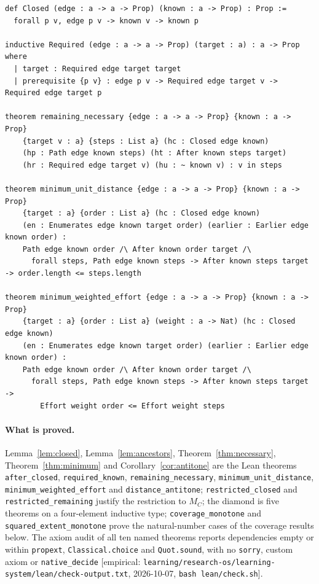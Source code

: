 \documentclass[11pt]{article}
\newcommand{\emp}[1]{\textcolor{bucketgray}{\footnotesize [empirical: #1]}}
\begin{document}
\begin{lstlisting}[style=bucketlean]
def Closed (edge : a -> a -> Prop) (known : a -> Prop) : Prop :=
  forall p v, edge p v -> known v -> known p

inductive Required (edge : a -> a -> Prop) (target : a) : a -> Prop where
  | target : Required edge target target
  | prerequisite {p v} : edge p v -> Required edge target v -> Required edge target p

theorem remaining_necessary {edge : a -> a -> Prop} {known : a -> Prop}
    {target v : a} {steps : List a} (hc : Closed edge known)
    (hp : Path edge known steps) (ht : After known steps target)
    (hr : Required edge target v) (hu : ~ known v) : v in steps

theorem minimum_unit_distance {edge : a -> a -> Prop} {known : a -> Prop}
    {target : a} {order : List a} (hc : Closed edge known)
    (en : Enumerates edge known target order) (earlier : Earlier edge known order) :
    Path edge known order /\ After known order target /\
      forall steps, Path edge known steps -> After known steps target -> order.length <= steps.length

theorem minimum_weighted_effort {edge : a -> a -> Prop} {known : a -> Prop}
    {target : a} {order : List a} (weight : a -> Nat) (hc : Closed edge known)
    (en : Enumerates edge known target order) (earlier : Earlier edge known order) :
    Path edge known order /\ After known order target /\
      forall steps, Path edge known steps -> After known steps target ->
        Effort weight order <= Effort weight steps
\end{lstlisting}

\paragraph{What is proved.}
Lemma~\ref{lem:closed}, Lemma~\ref{lem:ancestors}, Theorem~\ref{thm:necessary}, Theorem~\ref{thm:minimum} and Corollary~\ref{cor:antitone} are the Lean theorems \texttt{after\_closed}, \texttt{required\_known}, \texttt{remaining\_necessary}, \texttt{minimum\_\allowbreak unit\_\allowbreak distance}, \texttt{minimum\_\allowbreak weighted\_\allowbreak effort} and \texttt{distance\_\allowbreak antitone}; \texttt{restricted\_closed} and \texttt{restricted\_remaining} justify the restriction to $M_C$; the diamond is five theorems on a four-element inductive type; \texttt{coverage\_monotone} and \texttt{squared\_extent\_monotone} prove the natural-number cases of the coverage results below. The axiom audit of all ten named theorems reports dependencies empty or within \texttt{propext}, \texttt{Classical.choice} and \texttt{Quot.sound}, with no \texttt{sorry}, custom axiom or \texttt{native\_decide} \emp{\texttt{learning/\allowbreak research-os/\allowbreak learning-system/\allowbreak lean/\allowbreak check-output.\allowbreak txt}, 2026-10-07, \texttt{bash lean/\allowbreak check.\allowbreak sh}}.
\end{document}
